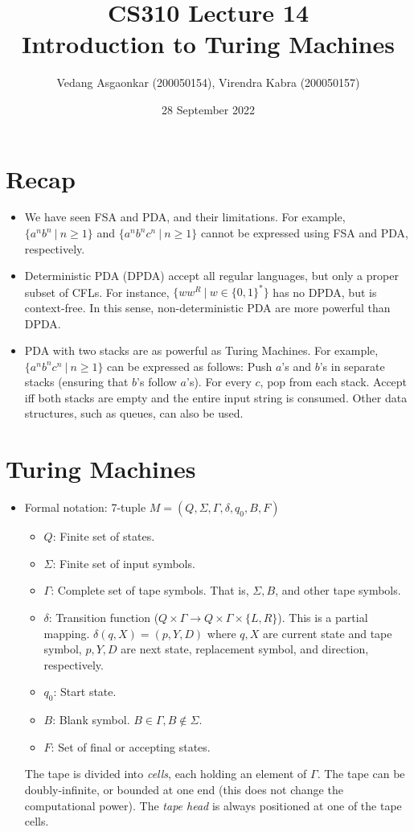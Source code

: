 \documentclass{article}
\title{\textbf{CS310 Lecture 14 \\ Introduction to Turing Machines}}
\author{Vedang Asgaonkar (200050154), Virendra Kabra (200050157)}
\date{28 September 2022}
\newcommand{\I}[1]{\textit{#1}}
\begin{document}
\begin{sloppypar}       %

    \maketitle

    \section{Recap}
    \begin{itemize}
        \item We have seen FSA and PDA, and their limitations. For example, $\{a^nb^n\ |\ n\ge1\}$ and $\{a^nb^nc^n\ |\ n\ge1\}$ cannot be expressed using FSA and PDA, respectively.
        \item Deterministic PDA (DPDA) accept all regular languages, but only a proper subset of CFLs. For instance, $\{ww^R\ |\ w\in\{0,1\}^*\}$ has no DPDA, but is context-free. In this sense, non-deterministic PDA are more powerful than DPDA.
        \item PDA with two stacks are as powerful as Turing Machines. For example, $\{a^nb^nc^n\ |\ n\ge1\}$ can be expressed as follows: Push $a$'s and $b$'s in separate stacks (ensuring that $b$'s follow $a$'s). For every $c$, pop from each stack. Accept iff both stacks are empty and the entire input string is consumed. Other data structures, such as queues, can also be used.
    \end{itemize}

    \section{Turing Machines}
    \begin{itemize}
        \item Formal notation: 7-tuple $M = (Q,\Sigma,\Gamma,\delta,q_0,B,F)$
        \begin{itemize}
            \item $Q$: Finite set of states.
            \item $\Sigma$: Finite set of input symbols.
            \item $\Gamma$: Complete set of tape symbols. That is, $\Sigma, B$, and other tape symbols.
            \item $\delta$: Transition function ($Q\times\Gamma \rightarrow Q\times\Gamma\times\{L,R\}$). This is a partial mapping. $\delta(q,X) = (p,Y,D)$ where $q,X$ are current state and tape symbol, $p,Y,D$ are next state, replacement symbol, and direction, respectively.
            \item $q_0$: Start state.
            \item $B$: Blank symbol. $B\in\Gamma, B\notin\Sigma$.
            \item $F$: Set of final or accepting states.
        \end{itemize}
        The tape is divided into \I{cells}, each holding an element of $\Gamma$. The tape can be doubly-infinite, or bounded at one end (this does not change the computational power). The \I{tape head} is always positioned at one of the tape cells.


\end{itemize}
\end{sloppypar}
\end{document}
